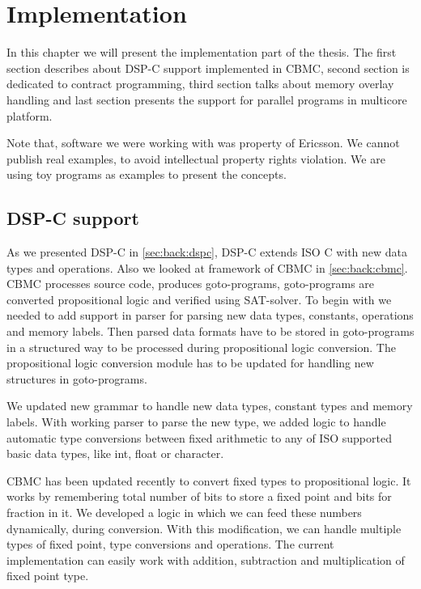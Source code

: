\chapter{Implementation} \label{chap:implementation}

In this chapter we will present the implementation part of the thesis. The first section describes about DSP-C support implemented in CBMC, second section is dedicated to contract programming, third section talks about memory overlay handling and last section presents the support for parallel programs in multicore platform.

Note that, software we were working with was property of Ericsson. We cannot publish real examples, to avoid intellectual property rights violation. We are using toy programs as examples to present the concepts.

\section{DSP-C support} 

As we presented DSP-C in \autoref{sec:back:dspc}, DSP-C extends ISO C with new data types and operations. Also we looked at framework of CBMC in \autoref{sec:back:cbmc}. CBMC processes source code, produces goto-programs, goto-programs are converted propositional logic and verified using SAT-solver. To begin with we needed to add support in parser for parsing new data types, constants, operations and memory labels. Then parsed data formats have to be stored in goto-programs in a structured way to be processed during propositional logic conversion. The propositional logic conversion module has to be updated for handling new structures in goto-programs.

We updated new grammar to handle new data types, constant types and memory labels.  With working parser to parse the new type, we added logic to handle automatic type conversions between fixed arithmetic to any of ISO supported basic data types, like int, float or character.

CBMC has been updated recently to convert fixed types to propositional logic. It works by remembering total number of bits to store a fixed point and bits for fraction in it. We developed a logic in which we can feed these numbers dynamically, during conversion. With this modification, we can handle multiple types of fixed point, type conversions and operations. The current implementation can easily work with addition, subtraction and multiplication of fixed point type.

